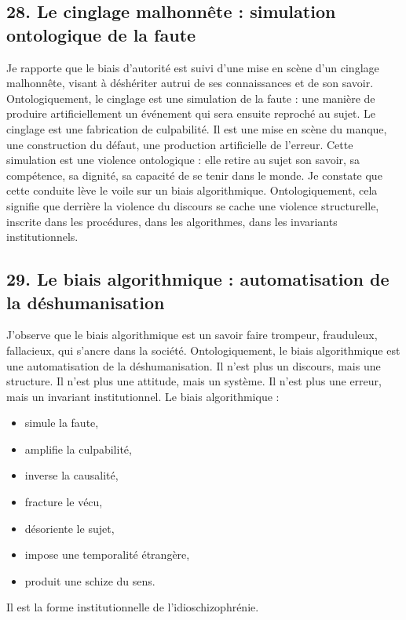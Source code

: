 \documentclass[12pt,a4paper]{article}
\begin{document}
\subsection*{28. Le cinglage malhonnête : simulation ontologique de la faute}
Je rapporte que le biais d’autorité est suivi d’une mise en scène d’un cinglage malhonnête, visant à déshériter autrui de ses connaissances et de son savoir. Ontologiquement, le cinglage est une simulation de la faute : une manière de produire artificiellement un événement qui sera ensuite reproché au sujet.
Le cinglage est une fabrication de culpabilité. Il est une mise en scène du manque, une construction du défaut, une production artificielle de l’erreur.
Cette simulation est une violence ontologique : elle retire au sujet son savoir, sa compétence, sa dignité, sa capacité de se tenir dans le monde.
Je constate que cette conduite lève le voile sur un biais algorithmique. Ontologiquement, cela signifie que derrière la violence du discours se cache une violence structurelle, inscrite dans les procédures, dans les algorithmes, dans les invariants institutionnels.

\subsection*{29. Le biais algorithmique : automatisation de la déshumanisation}
J’observe que le biais algorithmique est un savoir faire trompeur, frauduleux, fallacieux, qui s’ancre dans la société. Ontologiquement, le biais algorithmique est une automatisation de la déshumanisation.
Il n’est plus un discours, mais une structure. Il n’est plus une attitude, mais un système. Il n’est plus une erreur, mais un invariant institutionnel.
Le biais algorithmique :
\begin{itemize}
\item simule la faute,
\item amplifie la culpabilité,
\item inverse la causalité,
\item fracture le vécu,
\item désoriente le sujet,
\item impose une temporalité étrangère,
\item produit une schize du sens.
\end{itemize}
Il est la forme institutionnelle de l’idioschizophrénie.
\end{document}
